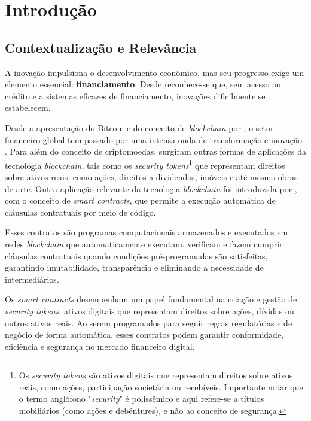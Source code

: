 \documentclass[12pt, a4paper, oneside, openright, chapter=TITLE]{abntex2}
\begin{document}

\pagestyle{plain} %

\section{Introdução}
\subsection{Contextualização e Relevância}
\hspace*{\parindent} A inovação impulsiona o desenvolvimento econômico, mas seu progresso exige um elemento essencial: \textbf{financiamento}. Desde  reconhece-se que, sem acesso ao crédito e a sistemas eficazes de financiamento, inovações dificilmente se estabelecem.

Desde a apresentação do Bitcoin e do conceito de \textit{blockchain} por , o setor financeiro global tem passado por uma intensa onda de transformação e inovação \cite{kondova2019}. Para além do conceito de criptomoedas, surgiram outras formas de aplicações da tecnologia \textit{blockchain}, tais como os \textit{security tokens}\footnote{Os \textit{security tokens} são ativos digitais que representam direitos sobre ativos reais, como ações, participação societária ou recebíveis. Importante notar que o termo anglófono "\textit{security}" é polissêmico e aqui refere-se a títulos mobiliários (como ações e debêntures), e não ao conceito de segurança.} que representam direitos sobre ativos reais, como ações, direitos a dividendos, imóveis e até mesmo obras de arte. Outra aplicação relevante da tecnologia \textit{blockchain} foi introduzida por , com o conceito de \textit{smart contracts}, que permite a execução automática de cláusulas contratuais por meio de código.

Esses contratos são programas computacionais armazenados e executados em redes \textit{blockchain} que automaticamente executam, verificam e fazem cumprir cláusulas contratuais quando condições pré-programadas são satisfeitas, garantindo imutabilidade, transparência e eliminando a necessidade de intermediários.

Os \textit{smart contracts} desempenham um papel fundamental na criação e gestão de \textit{security tokens}, ativos digitais que representam direitos sobre ações, dívidas ou outros ativos reais. Ao serem programados para seguir regras regulatórias e de negócio de forma automática, esses contratos podem garantir conformidade, eficiência e segurança no mercado financeiro digital.
\end{document}
